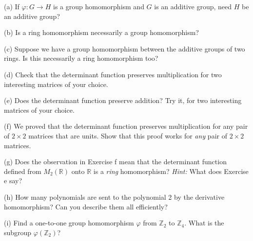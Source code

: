 \begin{problem}[Warmup]{(a)}
    If $\varphi : G \to H$ is a group homomorphism and $G$ is an additive group, need $H$ be an additive group?
\end{problem}
\unsolved

\begin{problem}[Warmup]{(b)}
    Is a ring homomorphism necessarily a group homomorphism?
\end{problem}
\unsolved

\begin{problem}[Warmup]{(c)}
    Suppose we have a group homomorphism between the additive groups of two rings. Is this necessarily a ring homomorphism too?
\end{problem}
\unsolved

\begin{problem}[Warmup]{(d)}
    Check that the determinant function preserves multiplication for two interesting matrices of your choice.
\end{problem}
\unsolved

\begin{problem}[Warmup]{(e)}
    Does the determinant function preserve addition? Try it, for two interesting matrices of your choice.
\end{problem}
\unsolved

\begin{problem}[Warmup]{(f)}
    We proved that the determinant function preserves multiplication for any pair of $2 \times 2$ matrices that are units. Show that this proof works for \emph{any} pair of $2 \times 2$ matrices.
\end{problem}
\unsolved

\begin{problem}[Warmup]{(g)}
    Does the observation in Exercise f mean that the determinant function defined from $M_2(\mathbb{R})$ onto $\mathbb{R}$ is a \emph{ring} homomorphism? \emph{Hint:} What does Exercise e say?
\end{problem}
\unsolved

\begin{problem}[Warmup]{(h)}
    How many polynomials are sent to the polynomial 2 by the derivative homomorphism? Can you describe them all efficiently?
\end{problem}
\unsolved

\begin{problem}[Warmup]{(i)}
    Find a one-to-one group homomorphism $\varphi$ from $\mathbb{Z}_2$ to $\mathbb{Z}_4$. What is the subgroup $\varphi(\mathbb{Z}_2)$?
\end{problem}
\unsolved

